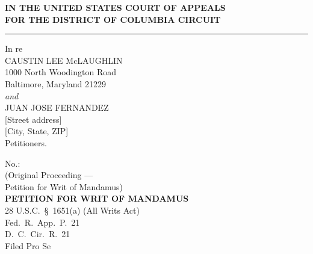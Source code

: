 \documentclass[14pt,letterpaper]{extarticle}
\newcommand{\R}{\S}
\begin{document}
\singlespacing

\thispagestyle{empty}
\begin{center}
\end{center}
\vspace{0.35in}

\begin{center}
\textbf{\large IN THE UNITED STATES COURT OF APPEALS\\[4pt]
FOR THE DISTRICT OF COLUMBIA CIRCUIT}
\end{center}
\vspace{2pt}\hrule\vspace{8pt}

\noindent
\begin{minipage}[t]{0.55\textwidth}
\raggedright
In re\\[4pt]
CAUSTIN LEE McLAUGHLIN\\
1000 North Woodington Road\\
Baltimore, Maryland 21229\\[5pt]
\hspace*{0.25in}\textit{and}\\[5pt]
JUAN JOSE FERNANDEZ\\
{[Street address]}\\
{[City, State, ZIP]}\\[8pt]
\hspace*{0.25in}Petitioners.
\end{minipage}\hfill
\begin{minipage}[t]{0.41\textwidth}
\raggedright
No.: \underline{\hspace{1.35in}}\\
(Original Proceeding ---\\
Petition for Writ of Mandamus)\\[12pt]
\textbf{PETITION FOR WRIT OF MANDAMUS}\\[8pt]
28 U.S.C.\ \R\ 1651(a) (All Writs Act)\\
Fed.\ R.\ App.\ P.\ 21\\
D.\ C.\ Cir.\ R.\ 21\\[8pt]
Filed Pro Se
\end{minipage}
\end{document}
